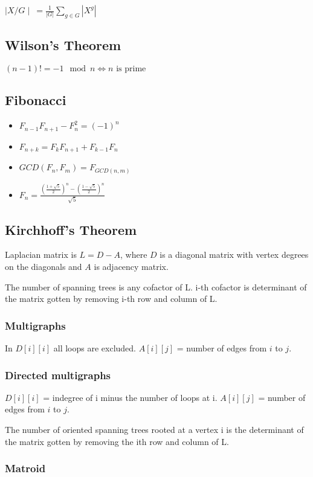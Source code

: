 \documentclass[a4paper,10pt,oneside]{article}
\begin{document}
\begin{multicols}{2}
$\mid X / G\mid~= \frac{1}{|G|} \sum_{g \in G}{|X^g|}$

\subsection{Wilson's Theorem}
$(n-1)! = -1 \mod n \iff n\text{ is prime}$

\subsection{Fibonacci}
\begin{itemize}
\item $F_{n-1}F_{n+1} - F_n^2 = (-1)^n$
\item $F_{n+k} = F_kF_{n+1} + F_{k-1}F_n$
\item $GCD(F_n, F_m) = F_{GCD(n, m)}$
\item $F_n = \frac{(\frac{1+\sqrt{5}}{2})^n - (\frac{1-\sqrt{5}}{2})^n}{\sqrt{5}}$
\end{itemize}

\subsection{Kirchhoff's Theorem}
Laplacian matrix is $L = D - A$, where $D$ is a diagonal matrix with vertex degrees on the diagonals and $A$ is adjacency matrix.

The number of spanning trees is any cofactor of L. i-th cofactor is determinant of the matrix gotten by removing i-th row and column of L.

\subsubsection{Multigraphs}
In $D[i][i]$ all loops are excluded. $A[i][j]$ = number of edges from $i$ to $j$.

\subsubsection{Directed multigraphs}
$D[i][i]$ = indegree of i minus the number of loops at i. $A[i][j]$ = number of edges from $i$ to $j$.

The number of oriented spanning trees rooted at a vertex i is the determinant of the matrix gotten by removing the ith row and column of L.

\subsubsection{Matroid}

\end{multicols}
\end{document}
